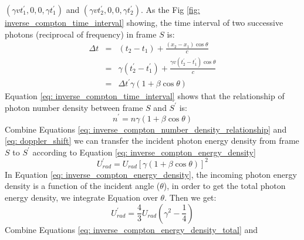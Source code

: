 \documentclass[12pt]{report}
\begin{document}
              $\left(\gamma v t_{1}^{\prime}, 0, 0, \gamma t_{1}^{\prime}\right)$ and 
              $\left(\gamma v t_{2}^{\prime}, 0, 0, \gamma t_{2}^{\prime}\right)$. 
            As the Fig \ref{fig: inverse_compton_time_interval} showing, the time interval of two successive 
            photons (reciprocal of frequency) in frame $S$ is: 
            \begin{eqnarray}
              \label{eq: inverse_compton_time_interval}
              \Delta t &=& \left(t_2 - t_1\right) + \frac{\left(x_2 - x_1\right) \cos{\theta}}{c}  \nonumber \\
                      &=& \gamma \left(t_{2}^{\prime} - t_{1}^{\prime}\right) + \frac{\gamma v \left(t_{2}^{\prime} - t_{1}^{\prime}\right) \cos{\theta}}{c} \nonumber \\
                      &=&  \Delta t^{\prime} \gamma \left(1 + \beta \cos{\theta}\right) 
            \end{eqnarray}
            Equation \ref{eq: inverse_compton_time_interval} shows that the relationship of photon number 
            density between frame $S$ and $S^{\prime}$ is:
            \begin{equation}
              \label{eq: inverse_compton_number_density_relationship}
              n^{\prime} = n \gamma \left(1 + \beta \cos{\theta}\right) 
            \end{equation}
            Combine Equations \ref{eq: inverse_compton_number_density_relationship} and 
            \ref{eq: doppler_shift} we can transfer the incident photon energy density from frame $S$ to 
            $S^{\prime}$ according to Equation \ref{eq: inverse_compton_energy_density}
            \begin{equation}
              \label{eq: inverse_compton_energy_density}
              U_{rad}^{\prime} = U_{rad} \left[\gamma \left(1 + \beta \cos{\theta}\right)\right]^{2}
            \end{equation}
            In Equation \ref{eq: inverse_compton_energy_density}, the incoming photon energy density 
            is a function of the incident angle ($\theta$), in order to get the total photon energy density,
            we integrate Equation over $\theta$. Then we get: 
            \begin{equation}
              \label{eq: inverse_compton_energy_density_total}
              U_{rad}^{\prime} = \frac{4}{3} U_{rad} \left(\gamma^2 - \frac{1}{4}\right)
            \end{equation}
            Combine Equations \ref{eq: inverse_compton_energy_density_total} and 
\end{document}
